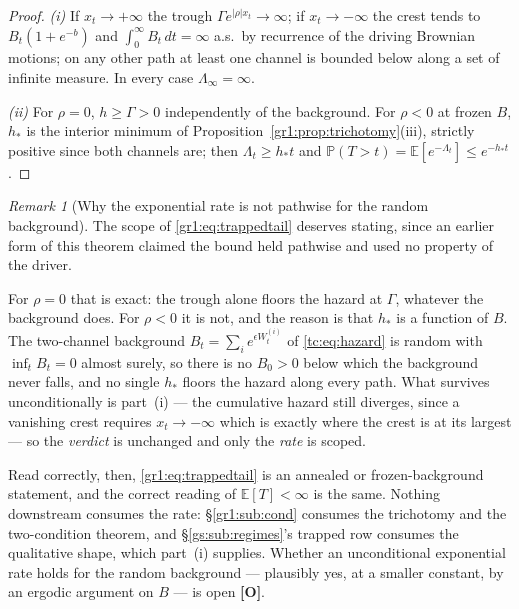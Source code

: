 \documentclass[11pt]{article}
\numberwithin{equation}{section}
\theoremstyle{plain}
\theoremstyle{definition}
\theoremstyle{remark}
\newtheorem{remark}[theorem]{Remark}
\newcommand{\E}{\mathbb{E}}
\newcommand{\PP}{\mathbb{P}}
\begin{document}
\begin{proof}
\emph{(i)} If $x_t\to+\infty$ the trough $\Gamma e^{|\rho|x_t}\to\infty$;
if $x_t\to-\infty$ the crest tends to $B_t(1+e^{-b})$ and
$\int_0^\infty B_t\,dt=\infty$ a.s.\ by recurrence of the driving
Brownian motions; on any other path at least one channel is bounded below
along a set of infinite measure. In every case $\Lambda_\infty=\infty$.

\emph{(ii)} For $\rho=0$, $h\ge\Gamma>0$ independently of the background.
For $\rho<0$ at frozen $B$, $h_\ast$ is the interior minimum of
Proposition~\ref{gr1:prop:trichotomy}(iii), strictly positive since both
channels are; then $\Lambda_t\ge h_\ast t$ and
$\PP(T>t)=\E[e^{-\Lambda_t}]\le e^{-h_\ast t}$.
\end{proof}

\begin{remark}[Why the exponential rate is not pathwise for the random
background]\label{gr1:rem:trappedscope}
The scope of \eqref{gr1:eq:trappedtail} deserves stating, since an
earlier form of this theorem claimed the bound held pathwise and used no
property of the driver.

For $\rho=0$ that is exact: the trough alone floors the hazard at
$\Gamma$, whatever the background does. For $\rho<0$ it is not, and the
reason is that $h_\ast$ is a function of $B$. The two-channel background
$B_t=\sum_i e^{\epsilon W^{(i)}_t}$ of \eqref{tc:eq:hazard} is random with
$\inf_t B_t=0$ almost surely, so there is no $B_0>0$ below which the
background never falls, and no single $h_\ast$ floors the hazard along
every path. What survives unconditionally is part~(i) --- the cumulative
hazard still diverges, since a vanishing crest requires $x_t\to-\infty$
which is exactly where the crest is at its largest --- so the
\emph{verdict} is unchanged and only the \emph{rate} is scoped.

Read correctly, then, \eqref{gr1:eq:trappedtail} is an annealed or
frozen-background statement, and the correct reading of $\E[T]<\infty$ is
the same. Nothing downstream consumes the rate: \S\ref{gr1:sub:cond}
consumes the trichotomy and the two-condition theorem, and
\S\ref{gs:sub:regimes}'s trapped row consumes the qualitative shape,
which part~(i) supplies. Whether an unconditional exponential rate holds
for the random background --- plausibly yes, at a smaller constant, by an
ergodic argument on $B$ --- is open \textbf{[O]}.
\end{remark}
\end{document}
